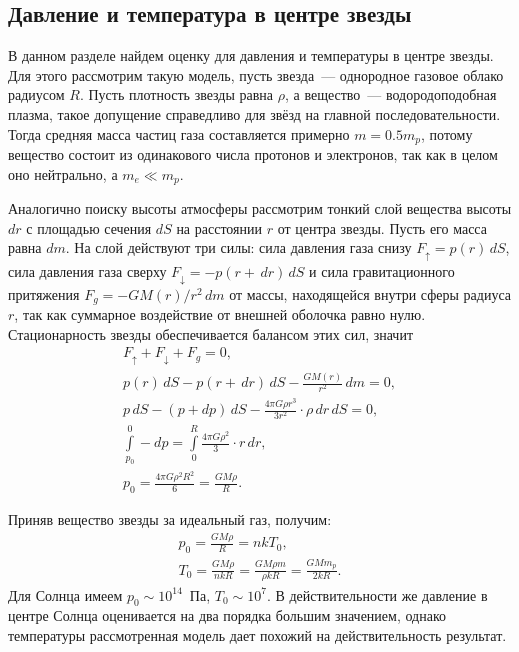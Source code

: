 \subsection{Давление и температура в центре звезды}
В данном разделе найдем оценку для давления и температуры в центре звезды. Для этого рассмотрим такую модель, пусть звезда~--- однородное газовое облако радиусом $R$. Пусть плотность звезды равна $\rho$, а вещество~--- водородоподобная плазма, такое допущение справедливо для звёзд на главной последовательности. Тогда средняя масса частиц газа составляется примерно $m = 0.5m_p$, потому вещество состоит из одинакового числа протонов и электронов, так как в целом оно нейтрально, а $m_e \ll m_p$.

Аналогично поиску высоты атмосферы рассмотрим тонкий слой вещества высоты $dr$ с площадью сечения $dS$ на расстоянии $r$ от центра звезды. Пусть его масса  равна $dm$. На слой действуют три силы: сила давления газа снизу $F_\uparrow = p(r)\,d S$, сила давления газа сверху $F_\downarrow = -p(r + \,d r)\,d S$ и сила гравитационного притяжения $F_g = -GM(r)/r^2\,d m$ от массы, находящейся внутри сферы радиуса $r$, так как суммарное воздействие от внешней оболочка равно нулю. Стационарность звезды обеспечивается балансом этих сил, значит
\begin{gather*}
	F_\uparrow + F_\downarrow + F_g = 0,\\
	p(r)\,d S - p(r + \,d r)\,d S - \frac{GM(r)}{r^2}\,d m = 0,\\
	p\,d S - (p + dp)\,d S - \frac{4\pi G \rho r^3}{3r^2} \cdot \rho \,d r \,d S = 0,\\
	\int\limits_{p_0}^0 -dp = \int\limits_{0}^R \frac{4\pi G \rho^2}{3} \cdot r\,d r,\\
 	p_0 = \frac{4\pi G \rho^2 R^2}{6} = \frac{GM\rho}{R}.
\end{gather*}

Приняв вещество звезды за идеальный газ, получим:
\begin{gather*}
	p_0 = \frac{G M \rho}{R} = n k T_0,\\
	T_0 = \frac{G M \rho}{n k R} = \frac{G M \rho m}{\rho k R} = \frac{G M m_p}{2k R}.
\end{gather*}
Для Солнца имеем $p_0 \sim 10^{14}$~Па, $T_0 \sim 10^7$. В действительности же давление в центре Солнца оценивается на два порядка большим значением, однако температуры рассмотренная модель дает похожий на действительность результат.
